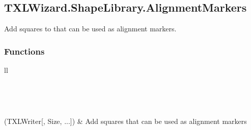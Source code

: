 \documentclass[letterpaper,10pt,english]{sphinxmanual}
\begin{document}
\subsection{TXLWizard.ShapeLibrary.AlignmentMarkers}
\label{Chapters/PythonModuleReference/ShapeLibrary/TXLWizard.ShapeLibrary.AlignmentMarkers:txlwizard-shapelibrary-alignmentmarkers}\label{Chapters/PythonModuleReference/ShapeLibrary/TXLWizard.ShapeLibrary.AlignmentMarkers:module-TXLWizard.ShapeLibrary.AlignmentMarkers}\label{Chapters/PythonModuleReference/ShapeLibrary/TXLWizard.ShapeLibrary.AlignmentMarkers::doc}
Add squares to  that can be used as alignment markers.


\subsubsection{Functions}
\label{Chapters/PythonModuleReference/ShapeLibrary/TXLWizard.ShapeLibrary.AlignmentMarkers:functions}
\begin{longtable}{ll}
\hline
\endfirsthead

%
{{}} \\
\hline
\endhead

\hline {} \\ \hline
\endfoot

\endlastfoot


{\hyperref[Chapters/PythonModuleReference/ShapeLibrary/TXLWizard.ShapeLibrary.AlignmentMarkers:TXLWizard.ShapeLibrary.AlignmentMarkers.GetAlignmentMarkers]{}}(TXLWriter{[}, Size, ...{]})
 & 
Add squares that can be used as alignment markers
\\
\hline\end{longtable}

\end{document}
